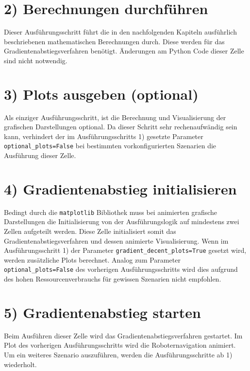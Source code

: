 \section*{2) Berechnungen durchführen}
Dieser Ausführungsschritt führt die in den nachfolgenden Kapiteln ausführlich beschriebenen mathematischen Berechnungen durch. Diese werden für das Gradientenabstiegsverfahren benötigt. Änderungen am Python Code dieser Zelle sind nicht notwendig.

\section*{3) Plots ausgeben (optional)}
Als einziger Ausführungsschritt, ist die Berechnung und Visualisierung der grafischen Darstellungen optional. Da dieser Schritt sehr rechenaufwändig sein kann, verhindert der im Ausführungsschritts 1) gesetzte Parameter \texttt{optional\_plots=False} bei bestimmten vorkonfigurierten Szenarien die Ausführung dieser Zelle.

\section*{4) Gradientenabstieg initialisieren}
Bedingt durch die \texttt{matplotlib} Bibliothek muss bei animierten grafische Darstellungen die Initialisierung von der Ausführungslogik auf mindestens zwei Zellen aufgeteilt werden. Diese Zelle initialisiert somit das Gradientenabstiegsverfahren und dessen animierte Visualisierung. Wenn im Ausführungsschritt 1) der Parameter \texttt{gradient\_decent\_plots=True} gesetzt wird, werden zusätzliche Plots berechnet. Analog zum Parameter \texttt{optional\_plots=False} des vorherigen Ausführungsschritts wird dies aufgrund des hohen Ressourcenverbrauchs für gewissen Szenarien nicht empfohlen.

\section*{5) Gradientenabstieg starten}
Beim Ausführen dieser Zelle wird das Gradientenabstiegsverfahren gestartet. Im Plot des vorherigen Ausführungsschritts wird die Roboternavigation animiert.
Um ein weiteres Szenario auszuführen, werden die Ausführungsschritte ab 1) wiederholt.


